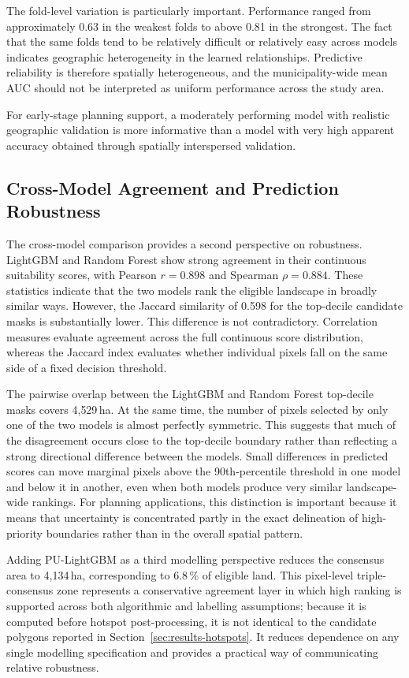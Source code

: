 \documentclass[land,article,submit,moreauthors]{Definitions/mdpi}
\begin{document}
The fold-level variation is particularly important. Performance ranged from approximately 0.63 in the weakest folds to above 0.81 in the strongest. The fact that the same folds tend to be relatively difficult or relatively easy across models indicates geographic heterogeneity in the learned relationships. Predictive reliability is therefore spatially heterogeneous, and the municipality-wide mean AUC should not be interpreted as uniform performance across the study area.

For early-stage planning support, a moderately performing model with realistic geographic validation is more informative than a model with very high apparent accuracy obtained through spatially interspersed validation.

\subsection{Cross-Model Agreement and Prediction Robustness}
\label{sec:discussion-agreement}

The cross-model comparison provides a second perspective on robustness. LightGBM and Random Forest show strong agreement in their continuous suitability scores, with Pearson $r=0.898$ and Spearman $\rho=0.884$. These statistics indicate that the two models rank the eligible landscape in broadly similar ways. However, the Jaccard similarity of 0.598 for the top-decile candidate masks is substantially lower. This difference is not contradictory. Correlation measures evaluate agreement across the full continuous score distribution, whereas the Jaccard index evaluates whether individual pixels fall on the same side of a fixed decision threshold.

The pairwise overlap between the LightGBM and Random Forest top-decile masks covers 4{,}529\,ha. At the same time, the number of pixels selected by only one of the two models is almost perfectly symmetric. This suggests that much of the disagreement occurs close to the top-decile boundary rather than reflecting a strong directional difference between the models. Small differences in predicted scores can move marginal pixels above the 90th-percentile threshold in one model and below it in another, even when both models produce very similar landscape-wide rankings. For planning applications, this distinction is important because it means that uncertainty is concentrated partly in the exact delineation of high-priority boundaries rather than in the overall spatial pattern.

Adding PU-LightGBM as a third modelling perspective reduces the consensus area to 4{,}134\,ha, corresponding to 6.8\,\% of eligible land. This pixel-level triple-consensus zone represents a conservative agreement layer in which high ranking is supported across both algorithmic and labelling assumptions; because it is computed before hotspot post-processing, it is not identical to the candidate polygons reported in Section~\ref{sec:results-hotspots}. It reduces dependence on any single modelling specification and provides a practical way of communicating relative robustness.
\end{document}
